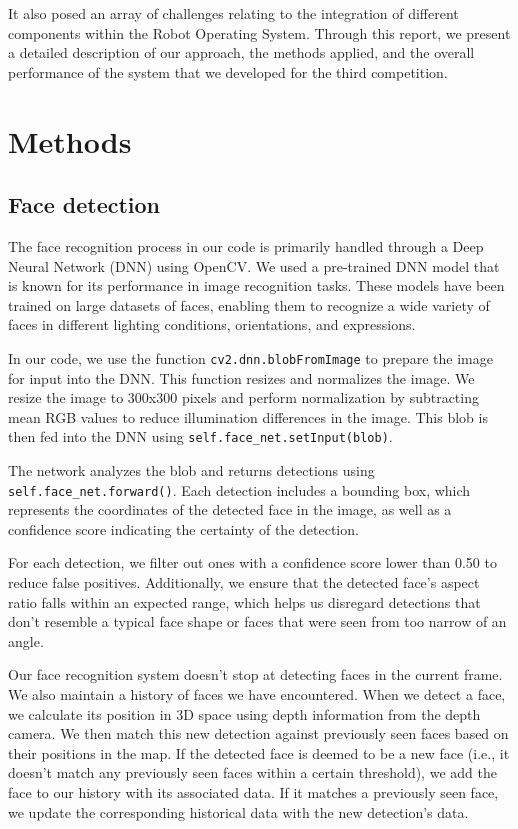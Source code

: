 \documentclass{article}
\begin{document}
It also posed an array of challenges relating to the integration of different components within the Robot Operating System. Through this report, we present a detailed description of our approach, the methods applied, and the overall performance of the system that we developed for the third competition.

\section{Methods}

\subsection{Face detection}
The face recognition process in our code is primarily handled through a Deep Neural Network (DNN) using OpenCV. We used a pre-trained DNN model that is known for its performance in image recognition tasks. These models have been trained on large datasets of faces, enabling them to recognize a wide variety of faces in different lighting conditions, orientations, and expressions.

In our code, we use the function \texttt{cv2.dnn.blobFromImage} to prepare the image for input into the DNN. This function resizes and normalizes the image. We resize the image to 300x300 pixels and perform normalization by subtracting mean RGB values to reduce illumination differences in the image. This blob is then fed into the DNN using \texttt{self.face\_net.setInput(blob)}.

The network analyzes the blob and returns detections using \texttt{self.face\_net.forward()}. Each detection includes a bounding box, which represents the coordinates of the detected face in the image, as well as a confidence score indicating the certainty of the detection.

For each detection, we filter out ones with a confidence score lower than 0.50 to reduce false positives. Additionally, we ensure that the detected face's aspect ratio falls within an expected range, which helps us disregard detections that don't resemble a typical face shape or faces that were seen from too narrow of an angle.

Our face recognition system doesn't stop at detecting faces in the current frame. We also maintain a history of faces we have encountered. When we detect a face, we calculate its position in 3D space using depth information from the depth camera. We then match this new detection against previously seen faces based on their positions in the map. If the detected face is deemed to be a new face (i.e., it doesn't match any previously seen faces within a certain threshold), we add the face to our history with its associated data. If it matches a previously seen face, we update the corresponding historical data with the new detection's data.
\end{document}
